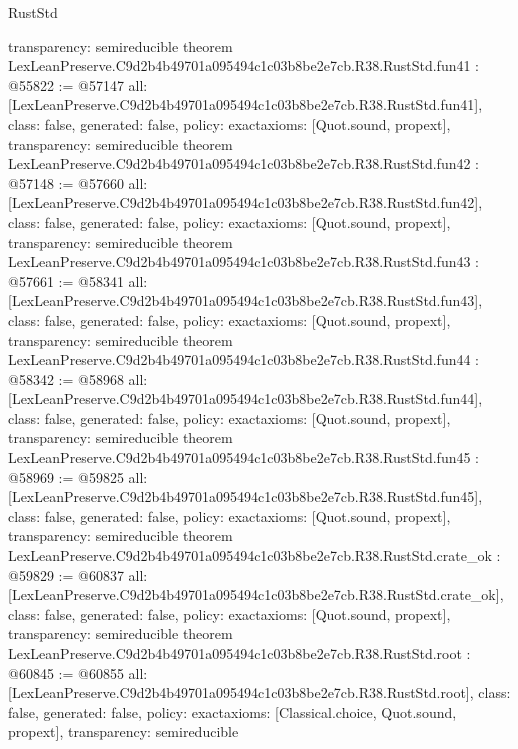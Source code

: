 \begin{lexlean}{RustStd}
\begin{coremodule}
{  transparency: semireducible
}
theorem LexLeanPreserve.C9d2b4b49701a095494c1c03b8be2e7cb.R38.RustStd.fun41 : @55822 := @57147 {
  all: [LexLeanPreserve.C9d2b4b49701a095494c1c03b8be2e7cb.R38.RustStd.fun41],
  class: false,
  generated: false,
  policy: exact{axioms: [Quot.sound, propext]},
  transparency: semireducible
}
theorem LexLeanPreserve.C9d2b4b49701a095494c1c03b8be2e7cb.R38.RustStd.fun42 : @57148 := @57660 {
  all: [LexLeanPreserve.C9d2b4b49701a095494c1c03b8be2e7cb.R38.RustStd.fun42],
  class: false,
  generated: false,
  policy: exact{axioms: [Quot.sound, propext]},
  transparency: semireducible
}
theorem LexLeanPreserve.C9d2b4b49701a095494c1c03b8be2e7cb.R38.RustStd.fun43 : @57661 := @58341 {
  all: [LexLeanPreserve.C9d2b4b49701a095494c1c03b8be2e7cb.R38.RustStd.fun43],
  class: false,
  generated: false,
  policy: exact{axioms: [Quot.sound, propext]},
  transparency: semireducible
}
theorem LexLeanPreserve.C9d2b4b49701a095494c1c03b8be2e7cb.R38.RustStd.fun44 : @58342 := @58968 {
  all: [LexLeanPreserve.C9d2b4b49701a095494c1c03b8be2e7cb.R38.RustStd.fun44],
  class: false,
  generated: false,
  policy: exact{axioms: [Quot.sound, propext]},
  transparency: semireducible
}
theorem LexLeanPreserve.C9d2b4b49701a095494c1c03b8be2e7cb.R38.RustStd.fun45 : @58969 := @59825 {
  all: [LexLeanPreserve.C9d2b4b49701a095494c1c03b8be2e7cb.R38.RustStd.fun45],
  class: false,
  generated: false,
  policy: exact{axioms: [Quot.sound, propext]},
  transparency: semireducible
}
theorem LexLeanPreserve.C9d2b4b49701a095494c1c03b8be2e7cb.R38.RustStd.crate_ok : @59829 := @60837 {
  all: [LexLeanPreserve.C9d2b4b49701a095494c1c03b8be2e7cb.R38.RustStd.crate_ok],
  class: false,
  generated: false,
  policy: exact{axioms: [Quot.sound, propext]},
  transparency: semireducible
}
theorem LexLeanPreserve.C9d2b4b49701a095494c1c03b8be2e7cb.R38.RustStd.root : @60845 := @60855 {
  all: [LexLeanPreserve.C9d2b4b49701a095494c1c03b8be2e7cb.R38.RustStd.root],
  class: false,
  generated: false,
  policy: exact{axioms: [Classical.choice, Quot.sound, propext]},
  transparency: semireducible
}


\end{coremodule}
\end{lexlean}
